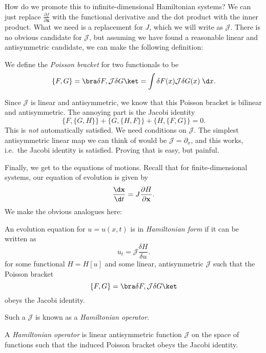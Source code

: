 \documentclass[a4paper]{article}
\begin{document}
How do we promote this to infinite-dimensional Hamiltonian systems? We can just replace $\frac{\partial f}{\partial \mathbf{x}}$ with the functional derivative and the dot product with the inner product. What we need is a replacement for $J$, which we will write as $\mathcal{J}$. There is no obvious candidate for $\mathcal{J}$, but assuming we have found a reasonable linear and antisymmetric candidate, we can make the following definition:

\begin{defi}
  We define the \emph{Poisson bracket} for two functionals to be
  \[
    \{F, G\} = \bra \delta F, \mathcal{J} \delta G\ket = \int \delta F(x) \mathcal{J} \delta G(x)\;\d x.
  \]
\end{defi}
Since $\mathcal{J}$ is linear and antisymmetric, we know that this Poisson bracket is bilinear and antisymmetric. The annoying part is the Jacobi identity
\[
  \{F, \{G, H\}\} + \{G, \{H, F\}\} + \{H, \{F, G\}\} = 0.
\]
This is \emph{not} automatically satisfied. We need conditions on $\mathcal{J}$. The simplest antisymmetric linear map we can think of would be $\mathcal{J} = \partial_x$, and this works, i.e.\ the Jacobi identity is satisfied. Proving that is easy, but painful.

Finally, we get to the equations of motions. Recall that for finite-dimensional systems, our equation of evolution is given by
\[
  \frac{\d \mathbf{x}}{\d t} = J \frac{\partial H}{\partial \mathbf{x}}.
\]
We make the obvious analogues here:
\begin{defi}
  An evolution equation for $u = u(x, t)$ is in \emph{Hamiltonian form} if it can be written as
  \[
    u_t = \mathcal{J} \frac{\delta H}{\delta u}.
  \]
  for some functional $H = H[u]$ and some linear, antisymmetric $\mathcal{J}$ such that the Poisson bracket
  \[
    \{F, G\} = \bra \delta F, \mathcal{J} \delta G\ket
  \]
  obeys the Jacobi identity.

\end{defi}

Such a $\mathcal{J}$ is known as a \emph{Hamiltonian operator}.
\begin{defi}
  A \emph{Hamiltonian operator} is linear antisymmetric function $\mathcal{J}$ on the space of functions such that the induced Poisson bracket obeys the Jacobi identity.
\end{defi}
\end{document}
